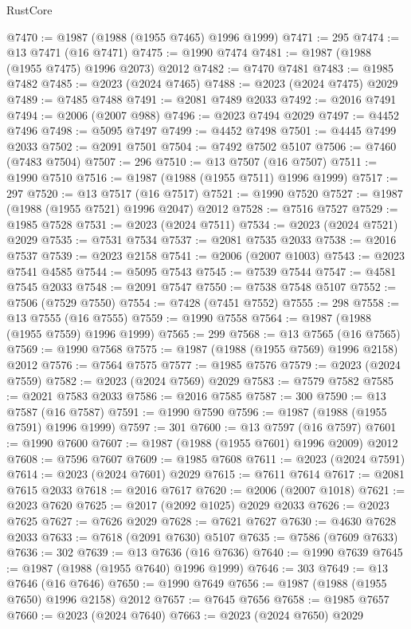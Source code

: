 \begin{lexlean}{RustCore}
\begin{coremodule}
@7470 := @1987 (@1988 (@1955 @7465) @1996 @1999)
@7471 := 295
@7474 := @13 @7471 (@16 @7471)
@7475 := @1990 @7474
@7481 := @1987 (@1988 (@1955 @7475) @1996 @2073) @2012
@7482 := @7470 @7481
@7483 := @1985 @7482
@7485 := @2023 (@2024 @7465)
@7488 := @2023 (@2024 @7475) @2029
@7489 := @7485 @7488
@7491 := @2081 @7489 @2033
@7492 := @2016 @7491
@7494 := @2006 (@2007 @988)
@7496 := @2023 @7494 @2029
@7497 := @4452 @7496
@7498 := @5095 @7497
@7499 := @4452 @7498
@7501 := @4445 @7499 @2033
@7502 := @2091 @7501
@7504 := @7492 @7502 @5107
@7506 := @7460 (@7483 @7504)
@7507 := 296
@7510 := @13 @7507 (@16 @7507)
@7511 := @1990 @7510
@7516 := @1987 (@1988 (@1955 @7511) @1996 @1999)
@7517 := 297
@7520 := @13 @7517 (@16 @7517)
@7521 := @1990 @7520
@7527 := @1987 (@1988 (@1955 @7521) @1996 @2047) @2012
@7528 := @7516 @7527
@7529 := @1985 @7528
@7531 := @2023 (@2024 @7511)
@7534 := @2023 (@2024 @7521) @2029
@7535 := @7531 @7534
@7537 := @2081 @7535 @2033
@7538 := @2016 @7537
@7539 := @2023 @2158
@7541 := @2006 (@2007 @1003)
@7543 := @2023 @7541 @4585
@7544 := @5095 @7543
@7545 := @7539 @7544
@7547 := @4581 @7545 @2033
@7548 := @2091 @7547
@7550 := @7538 @7548 @5107
@7552 := @7506 (@7529 @7550)
@7554 := @7428 (@7451 @7552)
@7555 := 298
@7558 := @13 @7555 (@16 @7555)
@7559 := @1990 @7558
@7564 := @1987 (@1988 (@1955 @7559) @1996 @1999)
@7565 := 299
@7568 := @13 @7565 (@16 @7565)
@7569 := @1990 @7568
@7575 := @1987 (@1988 (@1955 @7569) @1996 @2158) @2012
@7576 := @7564 @7575
@7577 := @1985 @7576
@7579 := @2023 (@2024 @7559)
@7582 := @2023 (@2024 @7569) @2029
@7583 := @7579 @7582
@7585 := @2021 @7583 @2033
@7586 := @2016 @7585
@7587 := 300
@7590 := @13 @7587 (@16 @7587)
@7591 := @1990 @7590
@7596 := @1987 (@1988 (@1955 @7591) @1996 @1999)
@7597 := 301
@7600 := @13 @7597 (@16 @7597)
@7601 := @1990 @7600
@7607 := @1987 (@1988 (@1955 @7601) @1996 @2009) @2012
@7608 := @7596 @7607
@7609 := @1985 @7608
@7611 := @2023 (@2024 @7591)
@7614 := @2023 (@2024 @7601) @2029
@7615 := @7611 @7614
@7617 := @2081 @7615 @2033
@7618 := @2016 @7617
@7620 := @2006 (@2007 @1018)
@7621 := @2023 @7620
@7625 := @2017 (@2092 @1025) @2029 @2033
@7626 := @2023 @7625
@7627 := @7626 @2029
@7628 := @7621 @7627
@7630 := @4630 @7628 @2033
@7633 := @7618 (@2091 @7630) @5107
@7635 := @7586 (@7609 @7633)
@7636 := 302
@7639 := @13 @7636 (@16 @7636)
@7640 := @1990 @7639
@7645 := @1987 (@1988 (@1955 @7640) @1996 @1999)
@7646 := 303
@7649 := @13 @7646 (@16 @7646)
@7650 := @1990 @7649
@7656 := @1987 (@1988 (@1955 @7650) @1996 @2158) @2012
@7657 := @7645 @7656
@7658 := @1985 @7657
@7660 := @2023 (@2024 @7640)
@7663 := @2023 (@2024 @7650) @2029

\end{coremodule}
\end{lexlean}
